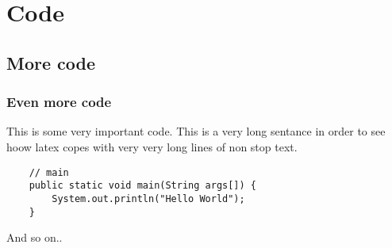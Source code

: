 \documentclass[a4paper,12pt]{article}
\begin{document}




\section{Code}
\subsection{More code}
\subsubsection{Even more code}
This is some very important code.
This is a very long sentance in order to see hoow latex copes with very very long lines of non stop text.
\begin{lstlisting}
	// main
	public static void main(String args[]) {
		System.out.println("Hello World");
	}
\end{lstlisting}

And so on..
\end{document}
